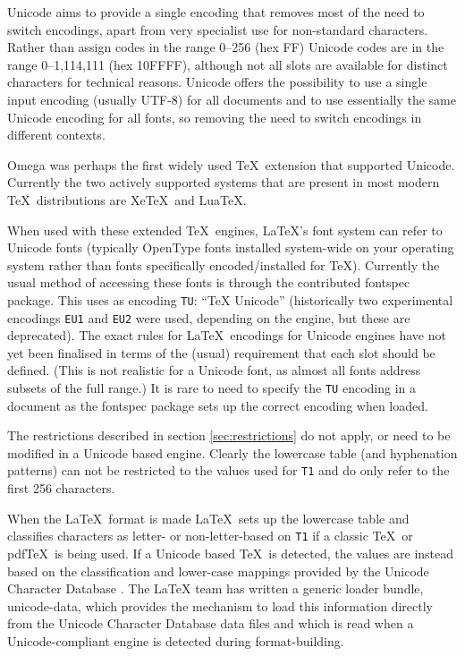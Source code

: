 \documentclass{ltxguide}[1994/11/20]
\providecommand{\Enc}[1]{\texttt{#1}}
\providecommand{\Pkg}[1]{%
  \textsf{#1}}
\begin{document}
Unicode aims to provide a single encoding that removes most of the
need to switch encodings, apart from very specialist use for non-standard characters. Rather than assign codes in the range 0--256 (hex
FF) Unicode codes are in the range 0--1,114,111 (hex 10FFFF), although
not all slots are available for distinct characters for technical
reasons. Unicode offers the possibility to use a single input encoding
(usually UTF-8) for all documents and to use essentially the same
Unicode encoding for all fonts, so removing the need to switch
encodings in different contexts.

Omega was perhaps the first widely used \TeX\ extension that
supported Unicode. Currently the two actively supported systems that are
present in most modern \TeX\ distributions are Xe\TeX\ and Lua\TeX.

When used with these extended \TeX\ engines, \LaTeX's font system can
refer to Unicode fonts (typically OpenType fonts installed system-wide
on your operating system rather than fonts specifically encoded/installed for
\TeX). Currently the usual method of accessing these fonts is through
the contributed \Pkg{fontspec} package. This uses as encoding \Enc{TU}:
``\TeX{} Unicode'' (historically two experimental encodings \Enc{EU1}
and \Enc{EU2}
were used, depending on the engine, but these are deprecated).
The exact rules for \LaTeX\ encodings
for Unicode engines have not yet been finalised in terms of the (usual)
requirement that each slot should be defined. (This is not realistic for
a Unicode font, as almost all fonts address subsets of the full range.)
It is rare to need to specify the \Enc{TU} encoding in a document as the
\Pkg{fontspec} package sets up the correct encoding when loaded.

The restrictions described in section \ref{sec:restrictions} do not
apply, or need to be modified in a Unicode based engine. Clearly the
lowercase table (and hyphenation patterns) can not be restricted to
the values used for \Enc{T1} and do only refer to the first 256
characters.

When the \LaTeX\ format is made \LaTeX\ sets up the lowercase table
and classifies characters as letter- or non-letter-based on \Enc{T1} if
a classic \TeX\ or pdf\TeX\ is being used. If a Unicode based \TeX\ is
detected, the values are instead based on the classification and
lower-case mappings provided by the Unicode Character Database
\cite{ucd}. The \LaTeX{} team has written a generic loader bundle,
\Pkg{unicode-data}, which provides the mechanism to load this information
directly from the Unicode Character Database data files and which is read
when a Unicode-compliant engine is detected during format-building.
\end{document}
